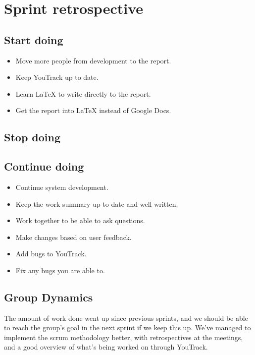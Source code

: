 \section{Sprint retrospective}
\label{sec:S4Retrospective}

\subsection{Start doing}
\label{subsec:S4RetrospectiveStart}

\begin{itemize}
   \item Move more people from development to the report.
   \item Keep YouTrack up to date.
   \item Learn LaTeX to write directly to the report.
   \item Get the report into LaTeX instead of Google Docs.
\end{itemize}

\subsection{Stop doing}
\label{subsec:S4RetrospectiveStop}

\subsection{Continue doing}
\label{subsec:S4RetrospectiveContinue}

\begin{itemize}
    \item Continue system development.
    \item Keep the work summary up to date and well written.
    \item Work together to be able to ask questions.
    \item Make changes based on user feedback.
    \item Add bugs to YouTrack.
    \item Fix any bugs you are able to.
\end{itemize}

\subsection{Group Dynamics}
\label{subsec:S4RetrospectiveGroupDynamics}

The amount of work done went up since previous sprints, and we should be able to reach the group's goal in the next sprint if we keep this up. We've managed to implement the scrum methodology better, with retrospectives at the meetings, and a good overview of what's being worked on through YouTrack.

